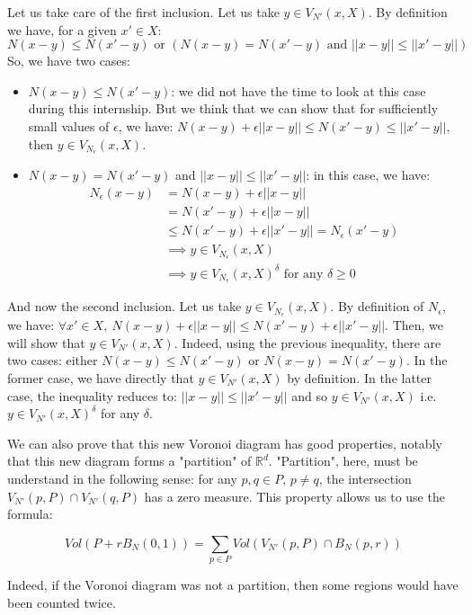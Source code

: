 Let us take care of the first inclusion. Let us take $ y \in V_{N'}(x, X) $. By
definition we have, for a given $ x' \in X $:
$$
N(x - y) \leq N(x' -y) \text{ or } (N(x - y) = N(x' - y) \text { and } || x -y
|| \leq || x' - y ||)
$$
So, we have two cases:
\begin{itemize}
    \item $ N(x - y) \leq N(x' - y) $: we did not have the time to look at this
        case during this internship. But we think that we can show that for
        sufficiently small values of $ \epsilon $, we have: $ N(x - y) +
        \epsilon || x  - y || \leq N(x' - y) \leq || x ' - y || $, then $ y \in
        V_{N_\epsilon}(x, X) $.
    \item $ N(x - y) = N(x' - y) $ and $ || x - y || \leq || x' - y || $: in
        this case, we have:
        \begin{align*}
            N_\epsilon(x - y) &= N(x - y) + \epsilon || x - y || \\
            &= N(x' - y) + \epsilon|| x - y || \\
            & \leq N(x' - y) + \epsilon || x' - y || = N_\epsilon(x' - y) \\
            & \implies y \in V_{N_\epsilon}(x, X) \\
            & \implies y \in V_{N_\epsilon}(x, X)^\delta \text{ for any } \delta
            \geq 0
        \end{align*}
\end{itemize}

And now the second inclusion. Let us take $ y \in V_{N_\epsilon}(x, X) $. By
definition of $ N_\epsilon $, we have: $ \forall x' \in X,~N(x - y) + \epsilon
|| x - y || \leq N(x' - y) + \epsilon || x' - y || $. Then, we will show that $
y \in V_{N'}(x, X) $. Indeed, using the previous inequality, there are two
cases: either $ N(x - y) \leq N(x' - y) $ or $ N(x - y) = N(x' - y) $. In the
former case, we have directly that $ y \in V_{N'}(x, X) $ by definition. In the
latter case, the inequality reduces to: $ || x - y || \leq || x' - y || $ and so
$ y \in V_{N'}(x, X) $ i.e. $ y \in V_{N'}(x, X)^{\delta} $ for any $ \delta $.

We can also prove that this new Voronoi diagram has good properties, notably
that this new diagram forms a "partition" of $ \mathbb{R}^d $. "Partition",
here, must be understand in the following sense: for any $ p, q \in P $, $ p
\neq q $, the intersection $ V_{N'}(p, P) \cap V_{N'}(q, P) $ has a zero measure.
This property allows us to use the formula:

$$ Vol(P+rB_N(0, 1)) = \sum_{p \in P} Vol(V_{N'}(p, P) \cap B_N(p, r)) $$

Indeed, if the Voronoi diagram was not a partition, then some regions would have
been counted twice.



